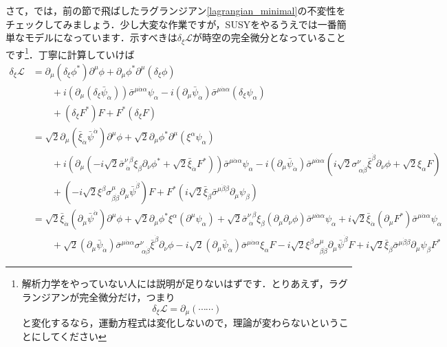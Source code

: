 \documentclass[a4paper,uplatex,dvipdfmx]{jsarticle}
\theoremstyle{definition}
\begin{document}
さて，では，前の節で飛ばしたラグランジアン\eqref{lagrangian_minimal}の不変性をチェックしてみましょう．少し大変な作業ですが，SUSYをやるうえでは一番簡単なモデルになっています．示すべきは$\delta_{\xi}\mathcal{L}$が時空の完全微分となっていることです\footnote{
  解析力学をやっていない人には説明が足りないはずです．とりあえず，ラグランジアンが完全微分だけ，つまり
  $$
    \delta_{\xi}\mathcal{L}
    =
    \partial_{\mu}(\cdots\cdots)
  $$
  と変化するなら，運動方程式は変化しないので，理論が変わらないということにしてください
}．丁寧に計算していけば
\begin{align}
  \delta_{\xi}\mathcal{L}
  &=
  \partial_{\mu}(\delta_{\xi}\phi^{*})\partial^{\mu}\phi
  +
  \partial_{\mu}\phi^{*}\partial^{\mu}(\delta_{\xi}\phi)
  \nonumber
  \\
  &\qquad
  +
  i(\partial_{\mu}(\delta_{\xi}\bar{\psi}_{\dot{\alpha}}))\bar{\sigma}^{\mu\dot{\alpha}\alpha}\psi_{\alpha}
  -
  i(\partial_{\mu}\bar{\psi}_{\dot{\alpha}})\bar{\sigma}^{\mu\dot{\alpha}\alpha}(\delta_{\xi}\psi_{\alpha})
  \nonumber
  \\
  &\qquad
  +
  (\delta_{\xi}F^{*})F  
  +
  F^{*}(\delta_{\xi}F)
  \nonumber
  \\
  &=
  \sqrt{2}\partial_{\mu}(\bar{\xi}_{\dot{\alpha}}\bar{\psi}^{\dot{\alpha}})\partial^{\mu}\phi
  +
  \sqrt{2}\partial_{\mu}\phi^{*}\partial^{\mu}(\xi^{\alpha}\psi_{\alpha})
  \nonumber
  \\
  &\qquad  
  +
  i(\partial_{\mu}(
    -i\sqrt{2}\bar{\sigma}^{\nu\ \beta}_{\ \dot{\alpha}}\xi_{\beta}\partial_{\nu}\phi^{*}
    +
    \sqrt{2}\bar{\xi}_{\dot{\alpha}}F^{*}
  ))\bar{\sigma}^{\mu\dot{\alpha}\alpha}\psi_{\alpha}
  -
  i(\partial_{\mu}\bar{\psi}_{\dot{\alpha}})\bar{\sigma}^{\mu\dot{\alpha}\alpha}(
    i\sqrt{2}\sigma^{\nu}_{\ \alpha\dot{\beta}}\bar{\xi}^{\dot{\beta}}\partial_{\nu}\phi+\sqrt{2}\xi_{\alpha}F
    )
  \nonumber
  \\
  &\qquad
  +
  (
    -i\sqrt{2}\xi^{\beta}\sigma^{\mu}_{\beta\dot{\beta}}\partial_{\mu}\bar{\psi}^{\dot{\beta}}
  )F  
  +
  F^{*}(
    i\sqrt{2}\bar{\xi}_{\dot{\beta}}\bar{\sigma}^{\mu\dot{\beta}\beta}\partial_{\mu}\psi_{\beta}
  )
  \nonumber
  \\
  &=
  \sqrt{2}\bar{\xi}_{\dot{\alpha}}(\partial_{\mu}\bar{\psi}^{\dot{\alpha}})\partial^{\mu}\phi
  +
  \sqrt{2}\partial_{\mu}\phi^{*}\xi^{\alpha}(\partial^{\mu}\psi_{\alpha})
  +
  \sqrt{2}\bar{\sigma}^{\nu\ \beta}_{\ \dot{\alpha}}\xi_{\beta}(\partial_{\mu}\partial_{\nu}\phi)
  \bar{\sigma}^{\mu\dot{\alpha}\alpha}\psi_{\alpha}
  +
  i\sqrt{2}\bar{\xi}_{\dot{\alpha}}(\partial_{\mu}F^{*})\bar{\sigma}^{\mu\dot{\alpha}\alpha}\psi_{\alpha}
  \nonumber
  \\
  &\qquad
  +
  \sqrt{2}(\partial_{\mu}\bar{\psi}_{\dot{\alpha}})\bar{\sigma}^{\mu\dot{\alpha}\alpha}\sigma^{\nu}_{\ \alpha\dot{\beta}}\bar{\xi}^{\dot{\beta}}\partial_{\nu}\phi
  -
  i\sqrt{2}(\partial_{\mu}\bar{\psi}_{\dot{\alpha}})\bar{\sigma}^{\mu\dot{\alpha}\alpha}\xi_{\alpha}F
  -
  i\sqrt{2}\xi^{\beta}\sigma^{\mu}_{\beta\dot{\beta}}\partial_{\mu}\bar{\psi}^{\dot{\beta}}F
  +
  i\sqrt{2}\bar{\xi}_{\dot{\beta}}\bar{\sigma}^{\mu\dot{\beta}\beta}\partial_{\mu}\psi_{\beta}F^{*}
  \label{variation_Lagrangian}
\end{align}
\end{document}
